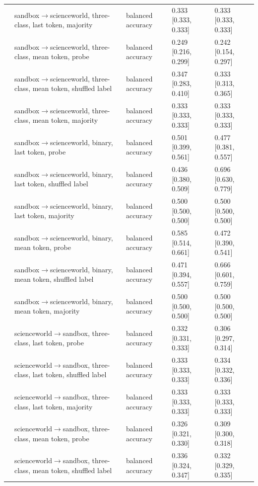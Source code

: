 \begin{tabular}{lllll}
 & sandbox$\rightarrow$scienceworld, three-class, last token, majority & balanced accuracy & 0.333 [0.333, 0.333] & 0.333 [0.333, 0.333] \\
 & sandbox$\rightarrow$scienceworld, three-class, mean token, probe & balanced accuracy & 0.249 [0.216, 0.299] & 0.242 [0.154, 0.297] \\
 & sandbox$\rightarrow$scienceworld, three-class, mean token, shuffled label & balanced accuracy & 0.347 [0.283, 0.410] & 0.333 [0.313, 0.365] \\
 & sandbox$\rightarrow$scienceworld, three-class, mean token, majority & balanced accuracy & 0.333 [0.333, 0.333] & 0.333 [0.333, 0.333] \\
 & sandbox$\rightarrow$scienceworld, binary, last token, probe & balanced accuracy & 0.501 [0.399, 0.561] & 0.477 [0.381, 0.557] \\
 & sandbox$\rightarrow$scienceworld, binary, last token, shuffled label & balanced accuracy & 0.436 [0.380, 0.509] & 0.696 [0.630, 0.779] \\
 & sandbox$\rightarrow$scienceworld, binary, last token, majority & balanced accuracy & 0.500 [0.500, 0.500] & 0.500 [0.500, 0.500] \\
 & sandbox$\rightarrow$scienceworld, binary, mean token, probe & balanced accuracy & 0.585 [0.514, 0.661] & 0.472 [0.390, 0.541] \\
 & sandbox$\rightarrow$scienceworld, binary, mean token, shuffled label & balanced accuracy & 0.471 [0.394, 0.557] & 0.666 [0.601, 0.759] \\
 & sandbox$\rightarrow$scienceworld, binary, mean token, majority & balanced accuracy & 0.500 [0.500, 0.500] & 0.500 [0.500, 0.500] \\
 & scienceworld$\rightarrow$sandbox, three-class, last token, probe & balanced accuracy & 0.332 [0.331, 0.333] & 0.306 [0.297, 0.314] \\
 & scienceworld$\rightarrow$sandbox, three-class, last token, shuffled label & balanced accuracy & 0.333 [0.333, 0.333] & 0.334 [0.332, 0.336] \\
 & scienceworld$\rightarrow$sandbox, three-class, last token, majority & balanced accuracy & 0.333 [0.333, 0.333] & 0.333 [0.333, 0.333] \\
 & scienceworld$\rightarrow$sandbox, three-class, mean token, probe & balanced accuracy & 0.326 [0.321, 0.330] & 0.309 [0.300, 0.318] \\
 & scienceworld$\rightarrow$sandbox, three-class, mean token, shuffled label & balanced accuracy & 0.336 [0.324, 0.347] & 0.332 [0.329, 0.335] \\

\end{tabular}
